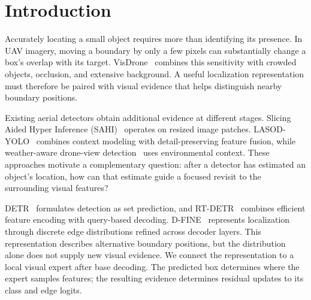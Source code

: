 \begin{abstract}
Small aerial objects are sensitive to boundary errors, motivating local visual refinement after initial detection. We introduce a box-conditioned expert in a distributional RT-DETR detector. Using the boundary representation of D-FINE, the expert samples multiscale features around predicted boxes and produces residual class and edge-logit updates. Its directly supervised predictions also supply localization targets, selected through object-correspondence, boundary-support, and quality checks. Shared P3 refinement supplies both prediction paths. On converted-label VisDrone, the complete system improves native test AP over stock RT-DETR-L by 5.861 points. Under a separate common evaluator, final-checkpoint AP exceeds D-FINE-L by 1.579 points with different training recipes. A matched validation comparison supports a 0.832-point benefit from shared P3 refinement within the expert-equipped configuration. The system processes 74.129 images/s in a fixed-input benchmark on RTX 4090 at $640\times640$, FP32, and batch eight.
\end{abstract}
\par
{}

\section{Introduction}
Accurately locating a small object requires more than identifying its presence. In UAV imagery, moving a boundary by only a few pixels can substantially change a box's overlap with its target. VisDrone~\cite{zhu2018visdrone} combines this sensitivity with crowded objects, occlusion, and extensive background. A useful localization representation must therefore be paired with visual evidence that helps distinguish nearby boundary positions.

Existing aerial detectors obtain additional evidence at different stages. Slicing Aided Hyper Inference (SAHI)~\cite{akyon2022sahi} operates on resized image patches. LASOD-YOLO~\cite{wang2026lasod} combines context modeling with detail-preserving feature fusion, while weather-aware drone-view detection~\cite{kim2024weather} uses environmental context. These approaches motivate a complementary question: after a detector has estimated an object's location, how can that estimate guide a focused revisit to the surrounding visual features?

DETR~\cite{carion2020detr} formulates detection as set prediction, and RT-DETR~\cite{zhao2024rtdetr} combines efficient feature encoding with query-based decoding. D-FINE~\cite{peng2025dfine} represents localization through discrete edge distributions refined across decoder layers. This representation describes alternative boundary positions, but the distribution alone does not supply new visual evidence. We connect the representation to a local visual expert after base decoding. The predicted box determines where the expert samples features; the resulting evidence determines residual updates to its class and edge logits.

